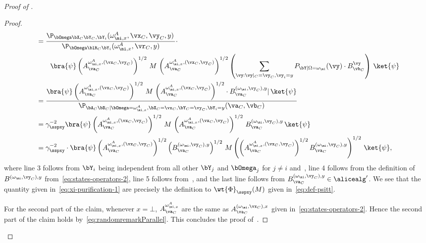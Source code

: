 \begin{proof}[Proof of ]
\begin{proof}
\begin{align}
			\notag &= \frac{ \P_{\bOmega \bX_C \bY_C, \bY_i} ( \omega_{\mi,x}^{A},\vx_C, \vy_C, y) \,  }{\P_{\bOmega \blR_C \bY_i } ( \omega_{\mi,x}^{A},\vr_C, y) }  \cdot \\
			& \qquad \bra{\psi} \left (A^{\omega_{\mi,x}^{A}, (\vx_C, \vy_C)}_{\va_C} \right)^{1/2} \, M \, \left(A^{\omega_{\mi,x}^{A}, (\vx_C, \vy_C)}_{\va_C} \right )^{1/2} \left( \sum_{\vy: \vy|_{C} = \vy_C,  \vy_i = y} P_{\bY| \Omega = \omega_{\mi}}(\vy) \cdot  B^\vy_{\vb_C} \right) \, \ket{\psi}   \notag \\
			&= \frac{\bra{\psi} \left (A^{\omega_{\mi,x}^{A}, (\vx_C, \vy_C)}_{\va_C} \right)^{1/2} \, M \, \left(A^{\omega_{\mi,x}^{A}, (\vx_C, \vy_C)}_{\va_C} \right )^{1/2} \cdot B^{(\omega_{\mi}, \vy_C), y}_{\va_C}| \, \ket{\psi}}{\P_{\bA_C \bB_C| \bOmega = \omega_{\mi,x}^{A}, \bX_C = \vx_C, \bY_C = \vy_C, \bY_i = y } ( \va_C, \vb_C) }     \notag \\
			&= \gamma_\sspxy^{-2} \bra{\psi} \left (A^{\omega_{\mi,x}^{A}, (\vx_C, \vy_C)}_{\va_C} \right)^{1/2} \, M \, \left(A^{\omega_{\mi,x}^{A}, (\vx_C, \vy_C)}_{\va_C} \right )^{1/2} \, B^{(\omega_{\mi}, \vy_C), y}_{\va_C} \, \ket{\psi} \notag \\
			\ &= \gamma_\sspxy^{-2}\cdot  \bra{\psi} \left(A^{\omega_{\mi,x}^{A}, (\vx_C, \vy_C)}_{\va_C} \right)^{1/2} \left(B^{(\omega_{\mi}, \vy_C), y}_{\va_C}\right)^{1/2}  \, M \left( \left(A^{\omega_{\mi,x}^{A}, (\vx_C, \vy_C)}_{\va_C} \right)^{1/2} B^{(\omega_{\mi}, \vy_C), y}_{\va_C}\right)^{1/2}  \, \ket{\psi},	\label{eq:xi-purification-1}
		\end{align}
		where line 3 follows from $\bY_i$ being independent from all other $\bY_j$ and $\bOmega_j$ for $j \neq i$ and~, line 4 follows from the definition of $ B^{(\omega_{\mi}, \vy_C), y}$ from~\eqref{eq:states-operators-2}, line 5 follows from~, and the last line follows from $B^{(\omega_{\mi}, \vy_C), y}_{\va_C}  \in \alicealg'$. We see that the quantity given in~\eqref{eq:xi-purification-1} are precisely the definition to $\wt{\Phi}_{\sspxy}(M)$ given in~\eqref{eq:def-psitt}. 
		
		For the second part of the claim, whenever $x = \bot$, $A^{\omega_{\mi,x}^{A}}_{\va_C}$ are the same as $	A^{(\omega_\mi,\vx_C), x}_{\va_C}$ given in~\eqref{eq:states-operators-2}. Hence the second part of the claim holds by~\eqref{eq:randomremarkParallel}. This concludes the proof of~.
	\end{proof}


\end{proof}
